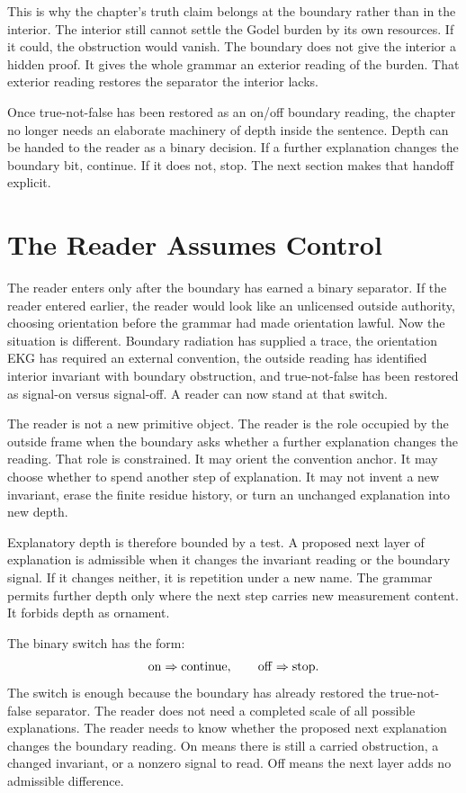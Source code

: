 This is why the chapter's truth claim belongs at the boundary rather than in
the interior. The interior still cannot settle the Godel burden by its own
resources. If it could, the obstruction would vanish. The boundary does not
give the interior a hidden proof. It gives the whole grammar an exterior
reading of the burden. That exterior reading restores the separator the
interior lacks.

Once true-not-false has been restored as an on/off boundary reading, the
chapter no longer needs an elaborate machinery of depth inside the sentence.
Depth can be handed to the reader as a binary decision. If a further
explanation changes the boundary bit, continue. If it does not, stop. The
next section makes that handoff explicit.

\section{The Reader Assumes Control}

The reader enters only after the boundary has earned a binary separator. If
the reader entered earlier, the reader would look like an unlicensed outside
authority, choosing orientation before the grammar had made orientation
lawful. Now the situation is different. Boundary radiation has supplied a
trace, the orientation EKG has required an external convention, the outside
reading has identified interior invariant with boundary obstruction, and
true-not-false has been restored as signal-on versus signal-off. A reader can
now stand at that switch.

The reader is not a new primitive object. The reader is the role occupied by
the outside frame when the boundary asks whether a further explanation
changes the reading. That role is constrained. It may orient the convention
anchor. It may choose whether to spend another step of explanation. It may
not invent a new invariant, erase the finite residue history, or turn an
unchanged explanation into new depth.

Explanatory depth is therefore bounded by a test. A proposed next layer of
explanation is admissible when it changes the invariant reading or the
boundary signal. If it changes neither, it is repetition under a new name.
The grammar permits further depth only where the next step carries new
measurement content. It forbids depth as ornament.

The binary switch has the form:
\[
  \mathrm{on} \Rightarrow \hbox{continue},
  \qquad
  \mathrm{off} \Rightarrow \hbox{stop}.
\]
The switch is enough because the boundary has already restored the
true-not-false separator. The reader does not need a completed scale of all
possible explanations. The reader needs to know whether the proposed next
explanation changes the boundary reading. On means there is still a carried
obstruction, a changed invariant, or a nonzero signal to read. Off means the
next layer adds no admissible difference.

